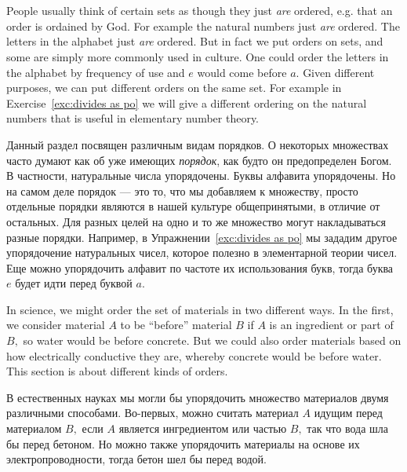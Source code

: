 \documentclass[../main/CT4S-EN-RU]{subfiles}
\begin{document}
\section{}\label{sec:orders}

\begin{blockENG}
People usually think of certain sets as though they just {\em are} ordered, e.g. that an order is ordained by God. For example the natural numbers just {\em are} ordered. The letters in the alphabet just {\em are} ordered. But in fact we put orders on sets, and some are simply more commonly used in culture. One could order the letters in the alphabet by frequency of use and $e$ would come before $a.$ Given different purposes, we can put different orders on the same set. For example in Exercise~\ref{exc:divides as po} we will give a different ordering on the natural numbers that is useful in elementary number theory.
\end{blockENG}

\begin{blockRUS}
Данный раздел посвящен различным видам порядков. О некоторых множествах часто думают как об уже имеющих {\em порядок}, как будто он предопределен Богом. В частности, натуральные числа упорядочены. Буквы алфавита упорядочены. Но на самом деле порядок — это то, что мы добавляем к множеству, просто отдельные порядки являются в нашей культуре общепринятыми, в отличие от остальных. Для разных целей на одно и то же множество могут накладываться разные порядки. Например, в Упражнении~\ref{exc:divides as po} мы зададим другое упорядочение натуральных чисел, которое полезно в элементарной теории чисел. Еще можно упорядочить алфавит по частоте их использования букв, тогда буква $e$ будет идти перед буквой $a.$ 
\end{blockRUS}

\begin{blockENG}
In science, we might order the set of materials in two different ways. In the first, we consider material $A$ to be “before” material $B$ if $A$ is an ingredient or part of $B,$ so water would be before concrete. But we could also order materials based on how electrically conductive they are, whereby concrete would be before water. This section is about different kinds of orders.
\end{blockENG}

\begin{blockRUS}
В естественных науках мы могли бы упорядочить множество материалов двумя различными способами. Во-первых, можно считать материал $A$ идущим перед материалом $B,$ если $A$ является ингредиентом или частью $B,$ так что вода шла бы перед бетоном. Но можно также упорядочить материалы на основе их электропроводности, тогда бетон шел бы перед водой.
\end{blockRUS}
\end{document}

